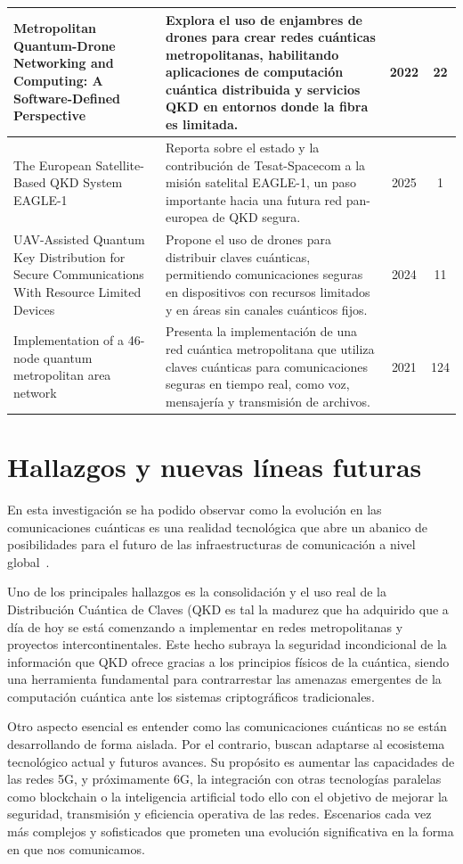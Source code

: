 \begin{longtable}{@{} p{4.5cm} p{6.5cm} c c @{}}
\hline
Metropolitan Quantum-Drone Networking and Computing: A Software-Defined Perspective~\cite{Chiti2022} & Explora el uso de enjambres de drones para crear redes cuánticas metropolitanas, habilitando aplicaciones de computación cuántica distribuida y servicios QKD en entornos donde la fibra es limitada. & 2022 & 22 \\
\hline
The European Satellite-Based QKD System EAGLE-1~\cite{Hiemstra2025} & Reporta sobre el estado y la contribución de Tesat-Spacecom a la misión satelital EAGLE-1, un paso importante hacia una futura red pan-europea de QKD segura. & 2025 & 1 \\
\hline
UAV-Assisted Quantum Key Distribution for Secure Communications With Resource Limited Devices~\cite{Kong2024} & Propone el uso de drones para distribuir claves cuánticas, permitiendo comunicaciones seguras en dispositivos con recursos limitados y en áreas sin canales cuánticos fijos. & 2024 & 11 \\
\hline
Implementation of a 46-node quantum metropolitan area network~\cite{ChenT2021} & Presenta la implementación de una red cuántica metropolitana que utiliza claves cuánticas para comunicaciones seguras en tiempo real, como voz, mensajería y transmisión de archivos. & 2021 & 124 \\
\end{longtable}

\section{Hallazgos y nuevas líneas futuras}

En esta investigación se ha podido observar como la evolución en las comunicaciones cuánticas es una realidad tecnológica que abre un abanico de posibilidades para el futuro de las infraestructuras de comunicación a nivel global~\cite{Hasan2023}.

Uno de los principales hallazgos es la consolidación y el uso real de la Distribución Cuántica de Claves (QKD es tal la madurez que ha adquirido que a día de hoy se está comenzando a implementar en redes metropolitanas y proyectos intercontinentales. Este hecho subraya la seguridad incondicional de la información que QKD ofrece gracias a los principios físicos de la cuántica, siendo una herramienta fundamental para contrarrestar las amenazas emergentes de la computación cuántica ante los sistemas criptográficos tradicionales.

Otro aspecto esencial es entender como las comunicaciones cuánticas no se están desarrollando de forma aislada. Por el contrario, buscan adaptarse al ecosistema tecnológico actual y futuros avances. Su propósito es aumentar las capacidades de las redes 5G, y próximamente 6G, la integración con otras tecnologías paralelas como blockchain o la inteligencia artificial todo ello con el objetivo de mejorar la seguridad, transmisión y eficiencia operativa de las redes. Escenarios cada vez más complejos y sofisticados que prometen una evolución significativa en la forma en que nos comunicamos. 
	
